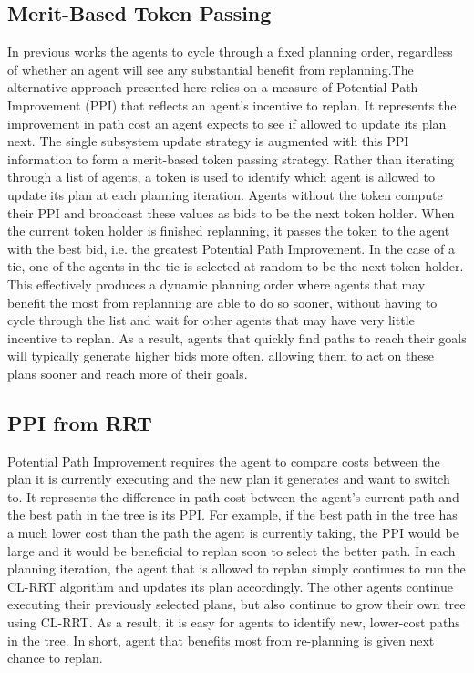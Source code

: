 \documentclass[a4paper]{article}
\begin{document}
\subsection{Merit-Based Token Passing}
In previous works the agents to cycle through a fixed planning order, regardless of whether an agent will see any substantial benefit from replanning.The alternative approach presented here relies on a measure of Potential Path Improvement (PPI) that reflects an agent’s incentive to replan. It represents the improvement in path cost an agent expects to see if allowed to update its plan next. The single subsystem update strategy is augmented with this PPI information to form a merit-based token passing strategy. Rather than iterating through a list of agents, a token is used to identify which agent is allowed to update its plan at each planning iteration. Agents without the token compute their PPI and broadcast these values as bids to be the next token holder. When the current token holder is finished replanning, it passes the token to the agent with the best bid, i.e. the greatest Potential Path Improvement. In the case of a tie, one of the agents in the tie is selected at random to be the next token holder. This effectively produces a dynamic planning order where agents that may benefit the most from replanning are able to do so sooner, without having to cycle through the list and wait for other agents that may have very little incentive to replan. As a result, agents that quickly find paths to reach their goals will typically generate higher bids more often, allowing them to act on these plans sooner and reach more of their goals.


\subsection{PPI from RRT}
Potential Path Improvement requires the agent to compare costs between the plan it is currently executing and the new plan it generates and want to switch to. It represents the difference in path cost between the agent’s current path and the best path in the tree is its PPI. For example, if the best path in the tree has a much lower cost than the path the agent is currently taking, the PPI would be large and it would be beneficial to replan soon to select the better path. In each planning iteration, the agent that is allowed to replan simply continues to run the CL-RRT algorithm and updates its plan accordingly. The other agents continue executing their previously selected plans, but also continue to grow their own tree using CL-RRT. As a result, it is easy for agents to identify new, lower-cost paths in the tree. In short, agent that benefits most from re-planning is given next chance to replan.
\end{document}
